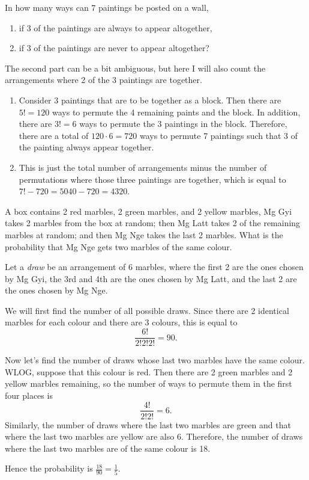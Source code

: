\begin{question}
    In how many ways can 7 paintings be posted on a wall,
    \begin{enumerate}
        \item if 3 of the paintings are always to appear altogether,
        
        \item if 3 of the paintings are never to appear altogether?
    \end{enumerate}
\end{question}
\begin{solution}
    The second part can be a bit ambiguous, but here I will also count the
    arrangements where 2 of the 3 paintings are together. 
    \begin{enumerate}
        \item Consider 3 paintings that are to be together as a block. Then
            there are $5! = 120$ ways to permute the 4 remaining paints and the
            block. In addition, there are $3! = 6$ ways to permute the 3
            paintings in the block. Therefore, there are a total of $120 \cdot
            6 = 720$ ways to permute 7 paintings such that 3 of the painting
            always appear together.

        \item This is just the total number of arrangements minus the number of
            permutations where those three paintings are together, which is
            equal to $7! - 720 = 5040 - 720 = 4320$. \qedhere
    \end{enumerate}
\end{solution}

\begin{question}
    A box contains 2 red marbles, 2 green marbles, and 2 yellow marbles, Mg Gyi
    takes 2 marbles from the box at random; then Mg Latt takes 2 of the
    remaining marbles at random; and then Mg Nge takes the last 2 marbles. What
    is the probability that Mg Nge gets two marbles of the same colour. 
\end{question}
\begin{solution}
    Let a \emph{draw} be an arrangement of 6 marbles, where the first 2 are the
    ones chosen by Mg Gyi, the 3rd and 4th are the ones chosen by Mg Latt, and
    the last 2 are the ones chosen by Mg Nge. 

    We will first find the number of all possible draws. Since there are 2
    identical marbles for each colour and there are 3 colours, this is equal to
    \[ \frac{6!}{2!2!2!} = 90. \]

    Now let's find the number of draws whose last two marbles have the same
    colour. WLOG, suppose that this colour is red. Then there are 2 green
    marbles and 2 yellow marbles remaining, so the number of ways to permute
    them in the first four places is
    \[ \frac{4!}{2!2!} = 6. \]
    Similarly, the number of draws where the last two marbles are green and
    that where the last two marbles are yellow are also 6. Therefore, the
    number of draws where the last two marbles are of the same colour is 18.

    Hence the probability is $\frac{18}{90} = \frac{1}{5}$.
\end{solution}

